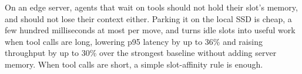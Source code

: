 \documentclass[conference,letterpaper]{IEEEtran}
\begin{document}
On an edge server, agents that wait on tools should not hold their slot's memory, and should not lose their context either. Parking it on the local SSD is cheap, a few hundred milliseconds at most per move, and turns idle slots into useful work when tool calls are long, lowering p95 latency by up to 36\% and raising throughput by up to 30\% over the strongest baseline without adding server memory. When tool calls are short, a simple slot-affinity rule is enough.



\end{document}
